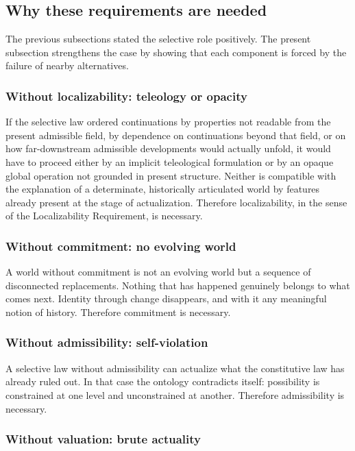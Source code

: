 \documentclass[11pt]{article}
\theoremstyle{foundation}
\begin{document}
\subsection{Why these requirements are needed}

The previous subsections stated the selective role positively. The present subsection strengthens the case by showing that each component is forced by the failure of nearby alternatives.

\subsubsection{Without localizability: teleology or opacity}

If the selective law ordered continuations by properties not readable from the present admissible field, by dependence on continuations beyond that field, or on how far-downstream admissible developments would actually unfold, it would have to proceed either by an implicit teleological formulation or by an opaque global operation not grounded in present structure. Neither is compatible with the explanation of a determinate, historically articulated world by features already present at the stage of actualization. Therefore localizability, in the sense of the Localizability Requirement, is necessary.

\subsubsection{Without commitment: no evolving world}

A world without commitment is not an evolving world but a sequence of disconnected replacements. Nothing that has happened genuinely belongs to what comes next. Identity through change disappears, and with it any meaningful notion of history. Therefore commitment is necessary.

\subsubsection{Without admissibility: self-violation}

A selective law without admissibility can actualize what the constitutive law has already ruled out. In that case the ontology contradicts itself: possibility is constrained at one level and unconstrained at another. Therefore admissibility is necessary.

\subsubsection{Without valuation: brute actuality}
\end{document}
